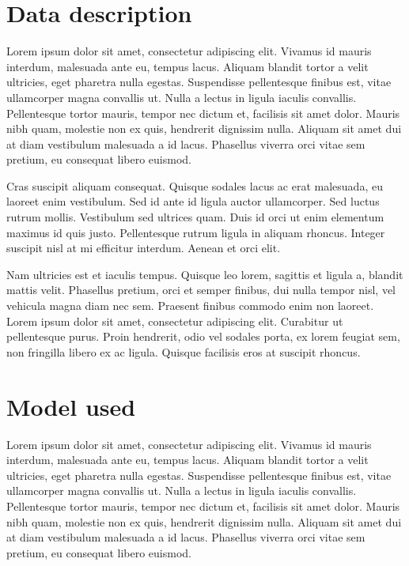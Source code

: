 \documentclass[a4paper, nobind]{templates/ociamthesis}
\theoremstyle{definition}
\theoremstyle{definition}
\theoremstyle{definition}
\theoremstyle{remark}
\begin{document}
\hypertarget{data-description}{%
\section{Data description}\label{data-description}}

Lorem ipsum dolor sit amet, consectetur adipiscing elit. Vivamus id mauris interdum, malesuada ante eu, tempus lacus. Aliquam blandit tortor a velit ultricies, eget pharetra nulla egestas. Suspendisse pellentesque finibus est, vitae ullamcorper magna convallis ut. Nulla a lectus in ligula iaculis convallis. Pellentesque tortor mauris, tempor nec dictum et, facilisis sit amet dolor. Mauris nibh quam, molestie non ex quis, hendrerit dignissim nulla. Aliquam sit amet dui at diam vestibulum malesuada a id lacus. Phasellus viverra orci vitae sem pretium, eu consequat libero euismod.

Cras suscipit aliquam consequat. Quisque sodales lacus ac erat malesuada, eu laoreet enim vestibulum. Sed id ante id ligula auctor ullamcorper. Sed luctus rutrum mollis. Vestibulum sed ultrices quam. Duis id orci ut enim elementum maximus id quis justo. Pellentesque rutrum ligula in aliquam rhoncus. Integer suscipit nisl at mi efficitur interdum. Aenean et orci elit.

Nam ultricies est et iaculis tempus. Quisque leo lorem, sagittis et ligula a, blandit mattis velit. Phasellus pretium, orci et semper finibus, dui nulla tempor nisl, vel vehicula magna diam nec sem. Praesent finibus commodo enim non laoreet. Lorem ipsum dolor sit amet, consectetur adipiscing elit. Curabitur ut pellentesque purus. Proin hendrerit, odio vel sodales porta, ex lorem feugiat sem, non fringilla libero ex ac ligula. Quisque facilisis eros at suscipit rhoncus.

\hypertarget{model-used}{%
\section{Model used}\label{model-used}}

Lorem ipsum dolor sit amet, consectetur adipiscing elit. Vivamus id mauris interdum, malesuada ante eu, tempus lacus. Aliquam blandit tortor a velit ultricies, eget pharetra nulla egestas. Suspendisse pellentesque finibus est, vitae ullamcorper magna convallis ut. Nulla a lectus in ligula iaculis convallis. Pellentesque tortor mauris, tempor nec dictum et, facilisis sit amet dolor. Mauris nibh quam, molestie non ex quis, hendrerit dignissim nulla. Aliquam sit amet dui at diam vestibulum malesuada a id lacus. Phasellus viverra orci vitae sem pretium, eu consequat libero euismod.
\end{document}
